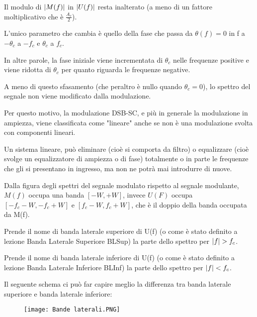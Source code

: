 Il modulo di $\abs{M(f)}$ in $\abs{U(f)}$ resta inalterato (a meno di un fattore moltiplicativo che è $\frac{A_c}{2}$). \newline 

L'unico parametro che cambia è quello della fase che passa da $\theta(f) = 0$ in f a $-\theta_c$ a $-f_c$ e $\theta_c$ a $f_c$. \newline 

In altre parole, la fase iniziale viene incrementata di $\theta_c$ nelle frequenze positive e viene ridotta di $\theta_c$ per quanto riguarda le frequenze negative. \newline 

A meno di questo sfasamento (che peraltro è nullo quando $\theta_c = 0$), 
lo spettro del segnale non viene modificato dalla modulazione. \newline 

Per questo motivo, la modulazione DSB-SC, e più in generale la modulazione in ampiezza, 
viene classificata come "lineare" anche se non è una modulazione svolta con componenti lineari. \newline 

Un sistema lineare, può eliminare (cioè si comporta da filtro) o equalizzare (cioè svolge un equalizzatore di ampiezza o di fase) totalmente o in parte le frequenze che gli si presentano in ingresso, 
ma non ne potrà mai introdurre di nuove. \newline 

Dalla figura degli spettri del segnale modulato rispetto al segnale modulante, 
$M(f)$ occupa una banda $[-W, +W]$, invece $U(F)$ occupa $[-f_c - W, -f_c +W]$ e $[f_c - W, f_c +W]$, 
che è il doppio della banda occupata da M(f). \newline 

Prende il nome di banda laterale superiore di U(f) (o come è stato definito a lezione Banda Laterale Superiore BLSup) 
la parte dello spettro per $\abs{f} > f_c$. \newline 

Prende il nome di banda laterale inferiore di U(f) (o come è stato definito a lezione Banda Laterale Inferiore BLInf) 
la parte dello spettro per $\abs{f} < f_c$. \newline 

Il seguente schema ci può far capire meglio la differenza tra banda laterale superiore e banda laterale inferiore: 

\begin{figure}[h]
    \centering
    \texttt{[image: Bande laterali.PNG]}
\end{figure} 

